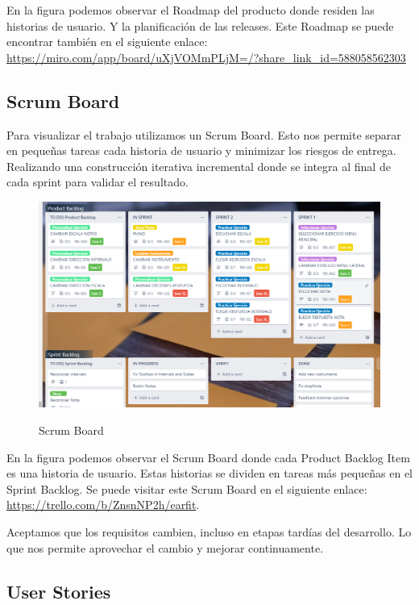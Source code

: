 \documentclass[12pt,twoside,titlepage]{report}
\begin{document}
En la figura podemos observar el Roadmap del producto donde residen las historias de usuario. Y la planificación de las releases. Este Roadmap se puede encontrar también en el siguiente enlace: \url{https://miro.com/app/board/uXjVOMmPLjM=/?share_link_id=588058562303}

\subsection{Scrum Board}

Para visualizar el trabajo utilizamos un Scrum Board. Esto nos permite separar en pequeñas tareas cada historia de usuario y minimizar los riesgos de entrega. Realizando una construcción iterativa incremental donde se integra al final de cada sprint para validar el resultado. 

\begin{figure}[H]
    \centering
    \includegraphics[scale=0.47]{Scrum/ScrumBoard}
    \label{fig:ScrumBoard}
    \caption{Scrum Board}
\end{figure}

En la figura podemos observar el Scrum Board donde cada Product Backlog Item es una historia de usuario. Estas historias se dividen en tareas más pequeñas en el Sprint Backlog. Se puede visitar este Scrum Board en el siguiente enlace: \url{https://trello.com/b/ZnsnNP2h/earfit}.

Aceptamos que los requisitos cambien, incluso en etapas tardías del desarrollo. Lo que nos permite aprovechar el cambio y mejorar continuamente.

\subsection{User Stories}
\end{document}
